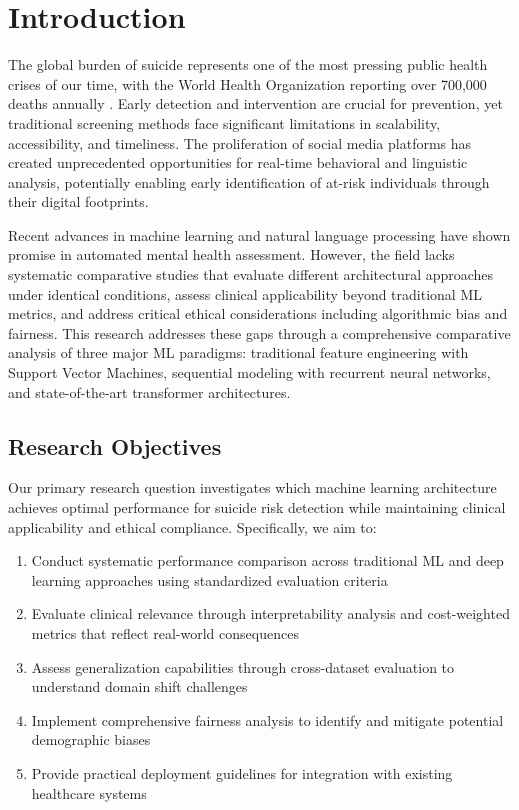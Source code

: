 \documentclass[conference]{IEEEtran}
\begin{document}
\section{Introduction}

The global burden of suicide represents one of the most pressing public health crises of our time, with the World Health Organization reporting over 700,000 deaths annually \cite{who2021}. Early detection and intervention are crucial for prevention, yet traditional screening methods face significant limitations in scalability, accessibility, and timeliness. The proliferation of social media platforms has created unprecedented opportunities for real-time behavioral and linguistic analysis, potentially enabling early identification of at-risk individuals through their digital footprints.

Recent advances in machine learning and natural language processing have shown promise in automated mental health assessment. However, the field lacks systematic comparative studies that evaluate different architectural approaches under identical conditions, assess clinical applicability beyond traditional ML metrics, and address critical ethical considerations including algorithmic bias and fairness. This research addresses these gaps through a comprehensive comparative analysis of three major ML paradigms: traditional feature engineering with Support Vector Machines, sequential modeling with recurrent neural networks, and state-of-the-art transformer architectures.

\subsection{Research Objectives}

Our primary research question investigates which machine learning architecture achieves optimal performance for suicide risk detection while maintaining clinical applicability and ethical compliance. Specifically, we aim to:

\begin{enumerate}
    \item Conduct systematic performance comparison across traditional ML and deep learning approaches using standardized evaluation criteria
    \item Evaluate clinical relevance through interpretability analysis and cost-weighted metrics that reflect real-world consequences
    \item Assess generalization capabilities through cross-dataset evaluation to understand domain shift challenges
    \item Implement comprehensive fairness analysis to identify and mitigate potential demographic biases
    \item Provide practical deployment guidelines for integration with existing healthcare systems
\end{enumerate}
\end{document}
